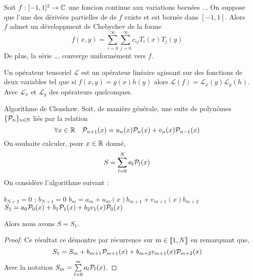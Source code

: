 \documentclass[10pt]{article}
\begin{document}
\begin{multicols}{2}
\begin{theorem}
  Soit $f : [-1,1]^2 \rightarrow \mathbb{C}$ une foncion continue aux variations bornées ... On suppose que l'une des dérivées partielles de de $f$ existe et est bornée dans $[-1,1]$. Alors $f$ admet un développment de Chebychev de la forme 
\begin{equation}
f(x,y) = \sum_{i=0} ^{\infty} \sum_{j=0} ^{\infty} c_{ij} T_i(x)T_j(y)
\end{equation}
De plus, la série ... converge uniformément vers $f$.
\end{theorem}




\begin{definition}
  Un opérateur tensoriel $\mathcal{L}$ est un opérateur linéaire agissant sur des fonctions de deux variables tel que si $f(x,y) = g(x)h(y)$ alors $\mathcal{L}(f) = \mathcal{L}_x(g)\mathcal{L}_y(h)$. Avec $ \mathcal{L}_x$ et $\mathcal{L}_y$ des opérateurs quelconques. 
\end{definition}

\begin{proposition}{Algorithme de Clenshaw}.
Soit, de manière générale, une suite de polynômes $\{\mathcal{P}_n\}_{n \in \mathbb{N}}$ liés par la relation
\begin{equation}
  \forall x \in \mathbb{R} \quad \mathcal{P}_{n+1}(x) = u_n(x)\mathcal{P}_n(x) + v_n(x)\mathcal{P}_{n-1}(x)
\end{equation}
On souhaite calculer, pour $x \in \mathbb{R}$ donné, 
\begin{equation}
  S = \sum_{l=0}^{N} a_l \mathcal{P}_l(x)
\end{equation}
On considère l'algorithme suivant :
\vspace*{-11pt}
\begin{algorithm}[H]
  \begin{algorithmic}[1]
    \STATE $b_{N+2} = 0$ ; $b_{N+1} = 0$
    \STATE $b_m = a_m + u_m(x)b_{m+1} + v_{m+1}(x)b_{m+2}$
    \ENDFOR
    \STATE $S_1 = a_0\mathcal{P}_0(x) + b_1\mathcal{P}_1(x) + b_2v_1(x)\mathcal{P}_0(x)$
  \end{algorithmic}
\end{algorithm}
\vspace*{-11pt}
\noindent
Alors nous avons $S = S_1$. 
\end{proposition}

\begin{proof}
Ce résultat ce démontre par récurrence sur $m \in  \llbracket 1,N \rrbracket $ en remarquant que,
\begin{equation}
S_1 = S_m +  b_{m+1}\mathcal{P}_{m+1}(x) + b_{m+2}v_{m+1}(x)\mathcal{P}_{m+2}(x)
\end{equation}
Avec la notation $S_m = \sum\limits_{l=0}^{m} a_l \mathcal{P}_l(x)$.
\end{proof}


\end{multicols}
\end{document}
